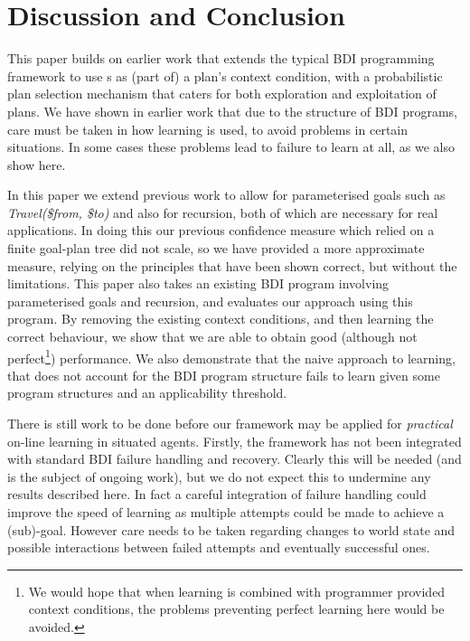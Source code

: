 \section{Discussion and Conclusion}\label{sec:discussion}

This paper builds on earlier work that extends
the typical BDI programming framework to use \dt{}s as (part of) a
plan's context condition, with a probabilistic plan selection
mechanism that caters for both exploration and exploitation of plans.
We have shown in earlier work that due to the structure of BDI
programs, care must be taken in how learning is used, to avoid
problems in certain situations. In some cases these problems lead to
failure to learn at all, as we also show here.

In this paper we extend previous work to allow for parameterised
goals such as {\it Travel(\$from, \$to)} and also for recursion, both
of which are necessary for real applications. In doing this our
previous confidence measure which relied on a finite goal-plan tree
did not scale, so we have provided a more approximate measure, relying
on the principles that have been shown correct, but without the
limitations. This paper also takes an existing BDI program involving
parameterised goals and recursion, and evaluates our approach using
this program. By removing the existing context conditions, and then
learning the correct behaviour, we show that we are able to obtain
good (although not perfect\footnote{We would hope that when learning
is combined with programmer provided context conditions, the problems
preventing perfect learning here would be avoided.}) performance. We
also demonstrate that the naive approach to learning, that does not
account for the BDI program structure fails to learn given
some program structures and an applicability threshold.

There is still work to be done before our framework may be applied for {\it practical} on-line learning in situated agents. Firstly, the framework has not been integrated with standard BDI failure handling and recovery. Clearly
this will be needed (and is the subject of ongoing work), but we do not expect this to undermine any results described here. In fact a careful integration of
failure handling could improve the speed of learning as multiple
attempts could be made to achieve a (sub)-goal. However care needs
to be taken regarding changes to world state and possible interactions
between failed attempts and eventually successful ones.

